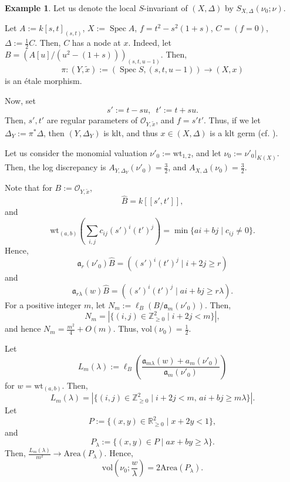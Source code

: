 \documentclass[a4paper,12pt]{amsart}
\theoremstyle{definition} %
\newtheorem{example}[theorem]{Example}
\theoremstyle{remark}
\numberwithin{equation}{section}
\newcommand{\R}{\mathbb{R}}
\newcommand{\Z}{\mathbb{Z}}
\def\Spec{\operatorname{Spec}}
\begin{document}
\begin{example} \label{chatchat}
Let us denote the local $S$-invariant of $(X,\Delta)$ by $S_{X,\Delta}(\nu_0;\nu)$.

\smallskip

Let $A:=k[s,t]_{(s,t)}$, $X:=\Spec A$, $f=t^2-s^2(1+s)$, $C=(f=0)$, $\Delta:=\frac{1}{2}C$. Then, $C$ has a node at $x$. Indeed, let $B=(A[u]/(u^2-(1+s)))_{(s,t,u-1)}$. Then,
$$ \pi:(Y,\tilde{x}):=(\Spec S,(s,t,u-1))\to (X,x)$$
is an étale morphism.

\smallskip

Now, set
$$ s':=t-su, \,\,\, t':=t+su.$$
Then, $s',t'$ are regular parameters of $\mathcal{O}_{Y,\tilde{x}}$, and $f=s't'$. Thus, if we let $\Delta_Y:=\pi^*\Delta$, then $(Y,\Delta_Y)$ is klt, and thus $x\in (X,\Delta)$ is a klt germ (cf. \cite[Proposition 2.24]{HLQ23}).

\smallskip

Let us consider the monomial valuation $\nu'_0:=\mathrm{wt}_{1,2}$, and let $\nu_0:=\nu'_0|_{K(X)}$. Then, the log discrepancy is $A_{Y,\Delta_Y}(\nu'_0)=\frac{3}{2}$, and $A_{X,\Delta}(\nu_0)=\frac{3}{2}$.

Note that for $B:=\mathcal{O}_{Y,\tilde{x}}$,
$$ \widehat{B}=k[[s',t']],$$
and
$$ \mathrm{wt}_{(a,b)}\left(\sum_{i,j}c_{ij}(s')^i(t')^j\right)=\min\{ai+bj\mid c_{ij}\ne 0\}.$$
Hence,
$$ \mathfrak{a}_{r}(\nu'_0)\widehat{B}=((s')^i(t')^j\mid i+2j\ge r)$$
and
$$ \mathfrak{a}_{r\lambda}(w)\widehat{B}=((s')^i(t')^j\mid ai+bj\ge r\lambda). $$
For a positive integer $m$, let $N_m:=\ell_B(B/\mathfrak{a}_m(\nu'_0))$. Then,
$$ N_m=|\{(i,j)\in \Z^2_{\ge 0}\mid i+2j<m\}|,$$
and hence $N_m=\frac{m^2}{4}+O(m)$. Thus, $\mathrm{vol}(\nu_0)=\frac{1}{2}$.

\smallskip

Let
$$ L_m(\lambda):=\ell_B\left(\frac{\mathfrak{a}_{m\lambda}(w)+a_m(\nu'_0)}{\mathfrak{a}_m(\nu'_0)}\right)$$
for $w=\mathrm{wt}_{(a,b)}$. Then,
$$ L_m(\lambda)=|\{(i,j)\in \Z^2_{\ge 0}\mid i+2j<m,\,ai+bj\ge m\lambda\}|.$$
Let
$$P:=\{(x,y)\in \R^2_{\ge 0}\mid x+2y<1\},$$
and
$$ P_{\lambda}:=\{(x,y)\in P\mid ax+by\ge \lambda\}.$$
Then, $\frac{L_m(\lambda)}{m^2}\to \mathrm{Area}(P_{\lambda})$. Hence,
$$ \mathrm{vol}\left(\nu_0;\frac{w}{\lambda}\right)=2\mathrm{Area}(P_{\lambda}).$$

\smallskip


\end{example}
\end{document}

